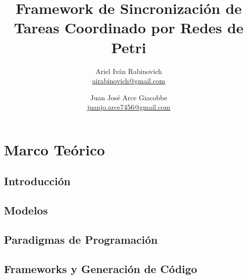 \documentclass{report}
\date{}
\newcounter{definitionsCounter}
\begin{document}
    \newcommand{\nombreTesis}{Framework de Sincronización de Tareas Coordinado
    por Redes de Petri}
    \newcommand{\nombreFramework}{Baboon}
    \newcommand{\javapetriconcurrencymonitor}{Java Petri Concurrency Monitor }
    \title{\nombreTesis}
    \author{Ariel Iván Rabinovich \\ \href{mailto:airabinovich@gmail.com}{airabinovich@gmail.com}
        \and Juan José Arce Giacobbe \\ \href{mailto:juanjo.arce7546@gmail.com}{juanjo.arce7456@gmail.com}}
    \graphicspath{ {resources/images/} }
    
    \maketitle
    
    \tableofcontents
    
    \listoffigures
    \listoftables
    
    \setcounter{definitionsCounter}{0}
    
    \part{Marco Teórico}
        \chapter{Introducción}
            
        \chapter{Modelos}
            
        \chapter{Paradigmas de Programación}
            
            
            
        \chapter{Frameworks y Generación de Código}
            
            
\end{document}
